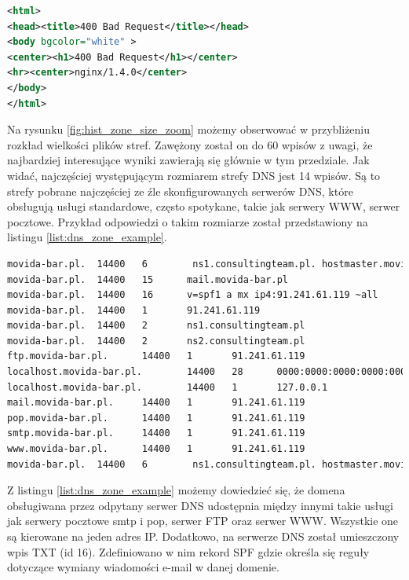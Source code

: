 \begin{lstlisting}[label={list:dnsHTTPmore},captionpos=b,caption=Rozszerzona odpowiedź HTTP 400 na zapytanie DNS.,language=xml]
<html>
<head><title>400 Bad Request</title></head>
<body bgcolor="white" >
<center><h1>400 Bad Request</h1></center>
<hr><center>nginx/1.4.0</center>
</body>
</html>
\end{lstlisting}

Na rysunku \ref{fig:hist_zone_size_zoom} możemy obserwować w przybliżeniu rozkład wielkości plików stref. Zawężony został on do 60
wpisów z uwagi, że najbardziej interesujące wyniki zawierają się głównie w tym przedziale. Jak widać, najczęściej występującym
rozmiarem strefy DNS jest 14 wpisów. Są to strefy pobrane najczęściej ze źle skonfigurowanych serwerów DNS, które obsługują usługi
standardowe, często spotykane, takie jak serwery WWW, serwer pocztowe. Przykład odpowiedzi o takim rozmiarze został przedstawiony na
listingu \ref{list:dns_zone_example}.

\begin{lstlisting}[label={list:dns_zone_example},captionpos=b,caption=Przykładowa odpowiedź na żądanie strefy DNS.,language=bash]
movida-bar.pl.  14400   6        ns1.consultingteam.pl. hostmaster.movida-bar.pl. 1952801133 3222735464 1869837421 1634956389 1925188727
movida-bar.pl.  14400   15      mail.movida-bar.pl
movida-bar.pl.  14400   16      v=spf1 a mx ip4:91.241.61.119 ~all
movida-bar.pl.  14400   1       91.241.61.119
movida-bar.pl.  14400   2       ns1.consultingteam.pl
movida-bar.pl.  14400   2       ns2.consultingteam.pl
ftp.movida-bar.pl.      14400   1       91.241.61.119
localhost.movida-bar.pl.        14400   28      0000:0000:0000:0000:0000:0000:0000:0001
localhost.movida-bar.pl.        14400   1       127.0.0.1
mail.movida-bar.pl.     14400   1       91.241.61.119
pop.movida-bar.pl.      14400   1       91.241.61.119
smtp.movida-bar.pl.     14400   1       91.241.61.119
www.movida-bar.pl.      14400   1       91.241.61.119
movida-bar.pl.  14400   6        ns1.consultingteam.pl. hostmaster.movida-bar.pl. 2013010900 14400 3600 1209600 86400
\end{lstlisting}

Z listingu \ref{list:dns_zone_example} możemy dowiedzieć się, że domena obsługiwana przez odpytany serwer DNS udostępnia między
innymi takie usługi jak serwery pocztowe smtp i pop, serwer FTP oraz serwer WWW. Wszystkie one są kierowane na jeden adres IP.
Dodatkowo, na serwerze DNS został umieszczony wpis TXT (id 16). Zdefiniowano w nim rekord SPF gdzie określa się reguły dotyczące
wymiany wiadomości e-mail w danej domenie.

